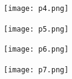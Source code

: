 \documentclass{beamer}
\begin{document}
\begin{frame}{}
	\begin{minipage}{0.42\linewidth}
		\texttt{[image: p4.png]}
	\end{minipage}
\end{frame}


\begin{frame}{}
	\begin{minipage}{0.42\linewidth}
		\texttt{[image: p5.png]}
	\end{minipage}
\end{frame}



\begin{frame}{}
	\begin{minipage}{0.42\linewidth}
		\texttt{[image: p6.png]}
	\end{minipage}
\end{frame}

\begin{frame}{}
	\begin{minipage}{0.42\linewidth}
		\texttt{[image: p7.png]}
	\end{minipage}
\end{frame}
\end{document}
